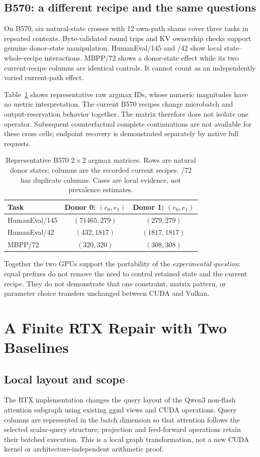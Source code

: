 \documentclass{article}
\begin{document}
\subsection{B570: a different recipe and the same questions}
On B570, six natural-state crosses with 12 own-path shams cover three tasks in repeated contexts. Byte-validated round trips and KV ownership checks support genuine donor-state manipulation. HumanEval/145 and /42 show local state--whole-recipe interactions. MBPP/72 shows a donor-state effect while its two current-recipe columns are identical controls. It cannot count as an independently varied current-path effect.

Table~\ref{tab:cross} shows representative raw argmax IDs, whose numeric magnitudes have no metric interpretation. The current B570 recipes change microbatch and output-reservation behavior together. The matrix therefore does not isolate one operator. Subsequent counterfactual complete continuations are not available for these cross cells; endpoint recovery is demonstrated separately by native full requests.

\begin{table}[t]
\centering\footnotesize\setlength{\tabcolsep}{3pt}
\caption{Representative B570 $2\times2$ argmax matrices. Rows are natural donor states; columns are the recorded current recipes. /72 has duplicate columns. Cases are local evidence, not prevalence estimates.}
\label{tab:cross}
\begin{tabular}{lcc}\toprule
Task & Donor 0: $(e_0,e_1)$ & Donor 1: $(e_0,e_1)$\\\midrule
HumanEval/145 & $(71465,279)$ & $(279,279)$\\
HumanEval/42 & $(432,1817)$ & $(1817,1817)$\\
MBPP/72 & $(320,320)$ & $(308,308)$\\\bottomrule
\end{tabular}
\end{table}

Together the two GPUs support the portability of the \emph{experimental question}: equal prefixes do not remove the need to control retained state and the current recipe. They do not demonstrate that one constraint, matrix pattern, or parameter choice transfers unchanged between CUDA and Vulkan.

\section{A Finite RTX Repair with Two Baselines}
\subsection{Local layout and scope}
The RTX implementation changes the query layout of the Qwen3 non-flash attention subgraph using existing ggml views and CUDA operations. Query columns are represented in the batch dimension so that attention follows the selected scalar-query structure; projection and feed-forward operations retain their batched execution. This is a local graph transformation, not a new CUDA kernel or architecture-independent arithmetic proof.
\end{document}
